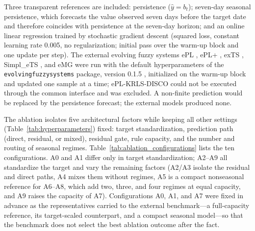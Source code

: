 \documentclass[preprint,12pt]{elsarticle}
\begin{document}
Three transparent references are included: persistence ($\widehat{y}=b_t$); seven-day seasonal persistence, which forecasts the value observed seven days before the target date and therefore coincides with persistence at the seven-day horizon; and an online linear regression trained by stochastic gradient descent (squared loss, constant learning rate 0.005, no regularization; initial pass over the warm-up block and one update per step). The external evolving fuzzy systems ePL \citep{lima2010epl}, ePL+ \citep{maciel2014eplplus}, exTS \citep{angelov2006exts}, Simpl\_eTS \citep{angelov2005simplets}, and eMG \citep{lemos2011emg} were run with the default hyperparameters of the \texttt{evolvingfuzzysystems} package, version 0.1.5 \citep{alves2025evolvingfuzzysystems}, initialized on the warm-up block and updated one sample at a time; ePL-KRLS-DISCO could not be executed through the common interface and was excluded. A non-finite prediction would be replaced by the persistence forecast; the external models produced none.

\label{subsec:ablation_design}
The ablation isolates five architectural factors while keeping all other settings (Table~\ref{tab:hyperparameters}) fixed: target standardization, prediction path (direct, residual, or mixed), residual gate, rule capacity, and the number and routing of seasonal regimes. Table~\ref{tab:ablation_configurations} lists the ten configurations. A0 and A1 differ only in target standardization; A2--A9 all standardize the target and vary the remaining factors (A2/A3 isolate the residual and direct paths, A4 mixes them without regimes, A5 is a compact nonseasonal reference for A6--A8, which add two, three, and four regimes at equal capacity, and A9 raises the capacity of A7). Configurations A0, A1, and A7 were fixed in advance as the representatives carried to the external benchmark---a full-capacity reference, its target-scaled counterpart, and a compact seasonal model---so that the benchmark does not select the best ablation outcome after the fact.
\end{document}
